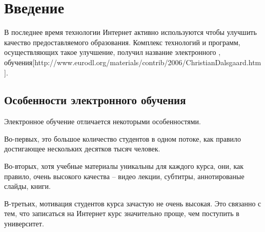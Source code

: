 \documentclass{matmex-diploma-custom}
\begin{document}
\maketitle
\tableofcontents
\section*{Введение}

В последнее время технологии Интернет активно используются чтобы
улучшить качество предоставляемого образования. Комплекс технологий и
программ, осуществляющих такое улучшение, получил название
электронного \cite{wiki:lcd},
обучения[http://www.eurodl.org/materials/contrib/2006/ChristianDalsgaard.htm].

\subsection*{Особенности электронного обучения}
Электронное обучение отличается некоторыми особенностями.

Во-первых, это большое количество студентов в одном потоке, как
правило достигающее нескольких десятков тысяч человек.

Во-вторых, хотя учебные материалы уникальны для каждого курса, они,
как правило, очень высокого качества -- видео лекции, субтитры,
аннотированые слайды, книги.

В-третьих, мотивация студентов курса зачастую не очень высокая. Это
связанно с тем, что записаться на Интернет курс значительно проще, чем
поступить в университет.
\end{document}
